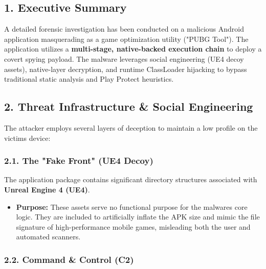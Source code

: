 \documentclass[
]{article}
\begin{document}
\subsection{\texorpdfstring{\textbf{1. Executive
Summary}}{1. Executive Summary}}\label{1-executive-summary}

A detailed forensic investigation has been conducted on a malicious
Android application masquerading as a game optimization utility ("PUBG
Tool"). The application utilizes a \textbf{multi-stage, native-backed
execution chain} to deploy a covert spying payload. The malware
leverages social engineering (UE4 decoy assets), native-layer
decryption, and runtime ClassLoader hijacking to bypass traditional
static analysis and Play Protect heuristics.

\subsection{\texorpdfstring{\textbf{2. Threat Infrastructure \& Social
Engineering}}{2. Threat Infrastructure \& Social Engineering}}\label{2-threat-infrastructure--social-engineering}

The attacker employs several layers of deception to maintain a low
profile on the victim\textquotesingle s device:

\subsubsection{\texorpdfstring{\textbf{2.1. The "Fake Front" (UE4
Decoy)}}{2.1. The "Fake Front" (UE4 Decoy)}}\label{21-the-fake-front-ue4-decoy}

The application package contains significant directory structures
associated with \textbf{Unreal Engine 4 (UE4)}.

\begin{itemize}
\item
  \textbf{Purpose:} These assets serve no functional purpose for the
  malware\textquotesingle s core logic. They are included to
  artificially inflate the APK size and mimic the file signature of
  high-performance mobile games, misleading both the user and automated
  scanners.
\end{itemize}

\subsubsection{\texorpdfstring{\textbf{2.2. Command \& Control
(C2)}}{2.2. Command \& Control (C2)}}\label{22-command--control-c2}
\end{document}
